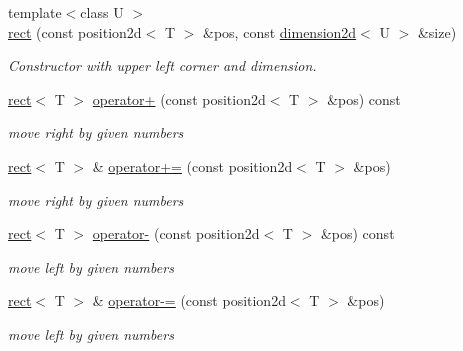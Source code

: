\begin{DoxyCompactItemize}
{\footnotesize template$<$class U $>$ }\\\hyperlink{classirr_1_1core_1_1rect_a54526b73a11cf90a4f4ff0c6d1556fcc}{rect} (const position2d$<$ T $>$ \&pos, const \hyperlink{classirr_1_1core_1_1dimension2d}{dimension2d}$<$ U $>$ \&size)
\begin{DoxyCompactList}\small\item\em Constructor with upper left corner and dimension. \end{DoxyCompactList}\item 
\mbox{\label{classirr_1_1core_1_1rect_ac6afa4c2102eb30bbb0cbd0615a9b533}} 
\hyperlink{classirr_1_1core_1_1rect}{rect}$<$ T $>$ \hyperlink{classirr_1_1core_1_1rect_ac6afa4c2102eb30bbb0cbd0615a9b533}{operator+} (const position2d$<$ T $>$ \&pos) const
\begin{DoxyCompactList}\small\item\em move right by given numbers \end{DoxyCompactList}\item 
\mbox{\label{classirr_1_1core_1_1rect_a4f4f1c3c3321d1ca5e9f617ebf47421c}} 
\hyperlink{classirr_1_1core_1_1rect}{rect}$<$ T $>$ \& \hyperlink{classirr_1_1core_1_1rect_a4f4f1c3c3321d1ca5e9f617ebf47421c}{operator+=} (const position2d$<$ T $>$ \&pos)
\begin{DoxyCompactList}\small\item\em move right by given numbers \end{DoxyCompactList}\item 
\mbox{\label{classirr_1_1core_1_1rect_ae65c0f6e91a4d575eb3d332ce571a416}} 
\hyperlink{classirr_1_1core_1_1rect}{rect}$<$ T $>$ \hyperlink{classirr_1_1core_1_1rect_ae65c0f6e91a4d575eb3d332ce571a416}{operator-\/} (const position2d$<$ T $>$ \&pos) const
\begin{DoxyCompactList}\small\item\em move left by given numbers \end{DoxyCompactList}\item 
\mbox{\label{classirr_1_1core_1_1rect_a3ef4f6f13ec79c3d5745df3a76f9e1e1}} 
\hyperlink{classirr_1_1core_1_1rect}{rect}$<$ T $>$ \& \hyperlink{classirr_1_1core_1_1rect_a3ef4f6f13ec79c3d5745df3a76f9e1e1}{operator-\/=} (const position2d$<$ T $>$ \&pos)
\begin{DoxyCompactList}\small\item\em move left by given numbers \end{DoxyCompactList}\item 

\end{DoxyCompactItemize}
